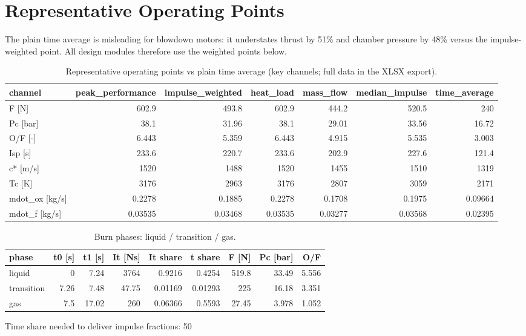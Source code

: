 \documentclass[11pt]{article}
\begin{document}
\section{Representative Operating Points}
The plain time average is misleading for blowdown motors: it understates thrust by 51\% and chamber pressure by 48\% versus the impulse-weighted point. All design modules therefore use the weighted points below.
\begin{table}[h!]\centering\small
\caption{Representative operating points vs plain time average (key channels; full data in the XLSX export).}
\begin{tabular}{lrrrrrr}\toprule
channel & peak\_performance & impulse\_weighted & heat\_load & mass\_flow & median\_impulse & time\_average \\
\midrule
F [N] & 602.9 & 493.8 & 602.9 & 444.2 & 520.5 & 240 \\
Pc [bar] & 38.1 & 31.96 & 38.1 & 29.01 & 33.56 & 16.72 \\
O/F [-] & 6.443 & 5.359 & 6.443 & 4.915 & 5.535 & 3.003 \\
Isp [s] & 233.6 & 220.7 & 233.6 & 202.9 & 227.6 & 121.4 \\
c* [m/s] & 1520 & 1488 & 1520 & 1455 & 1510 & 1319 \\
Tc [K] & 3176 & 2963 & 3176 & 2807 & 3059 & 2171 \\
mdot\_ox [kg/s] & 0.2278 & 0.1885 & 0.2278 & 0.1708 & 0.1975 & 0.09664 \\
mdot\_f [kg/s] & 0.03535 & 0.03468 & 0.03535 & 0.03277 & 0.03568 & 0.02395 \\
\bottomrule\end{tabular}\end{table}
\begin{table}[h!]\centering\small
\caption{Burn phases: liquid / transition / gas.}
\begin{tabular}{lrrrrrrrr}\toprule
phase & t0 [s] & t1 [s] & It [Ns] & It share & t share & F [N] & Pc [bar] & O/F \\
\midrule
liquid & 0 & 7.24 & 3764 & 0.9216 & 0.4254 & 519.8 & 33.49 & 5.556 \\
transition & 7.26 & 7.48 & 47.75 & 0.01169 & 0.01293 & 225 & 16.18 & 3.351 \\
gas & 7.5 & 17.02 & 260 & 0.06366 & 0.5593 & 27.45 & 3.978 & 1.052 \\
\bottomrule\end{tabular}\end{table}
Time share needed to deliver impulse fractions: 50%
\end{document}
